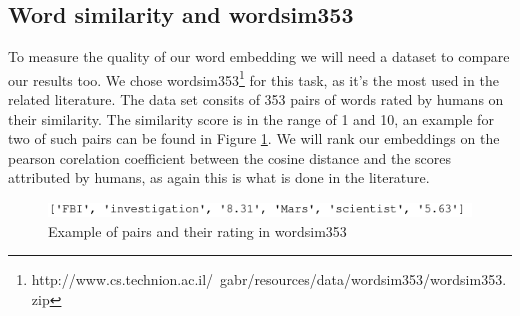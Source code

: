 \subsection{Word similarity and wordsim353}
To measure the quality of our word embedding we will need a dataset to compare our results too. We chose  wordsim353\footnote{http://www.cs.technion.ac.il/~gabr/resources/data/wordsim353/wordsim353.zip} for this task, as it's the most used in the related literature. The data set consits of 353 pairs of words rated by humans on their similarity. The similarity score is in the range of 1 and 10, an example for two of such pairs can be found in Figure \ref{fig:ws353_ex}. We will rank our embeddings on the pearson corelation coefficient between the cosine distance and the scores attributed by humans, as again this is what is done in the literature. 
\begin{figure}[ht]
    \centering
			\includegraphics[scale=0.7]{images/wordsim353_example} 
    \caption{Example of pairs and their rating in wordsim353}
    \label{fig:ws353_ex}
\end{figure}

